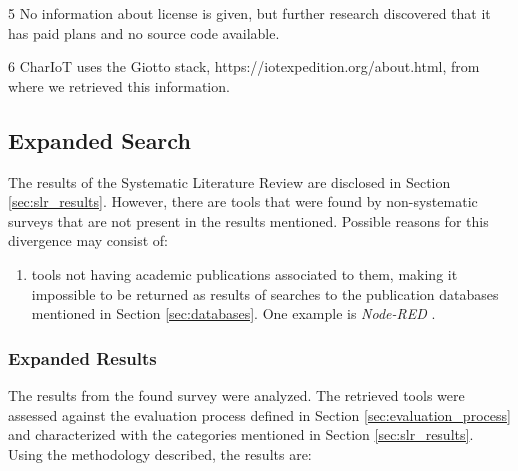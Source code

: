 \begin{table}[ht]
\begin{threeparttable}
\begin{tablenotes}
        \item[5] No information about license is given, but further research discovered that it has paid plans and no source code available.
        \item[6] CharIoT uses the Giotto stack, https://iotexpedition.org/about.html, from where we retrieved this information.
    \end{tablenotes}
    \end{threeparttable}
    \label{tab:slr_table_results}
\end{table}{}

\subsection{Expanded Search}\label{sec:slr_expanded_research}

The results of the Systematic Literature Review are disclosed in Section \ref{sec:slr_results}. However, there are tools that were found by non-systematic surveys \cite{survey_vpl_iot} that are not present in the results mentioned. Possible reasons for this divergence may consist of:
\begin{enumerate}
    \item tools not having academic publications associated to them, making it impossible to be returned as results of searches to the publication databases mentioned in Section \ref{sec:databases}. One example is \textit{Node-RED} \cite{node_red}.
\end{enumerate}

\subsubsection{Expanded Results}

The results from the found survey \cite{survey_vpl_iot} were analyzed. The retrieved tools were assessed against the evaluation process defined in Section \ref{sec:evaluation_process} and characterized with the categories mentioned in Section \ref{sec:slr_results}. Using the methodology described, the results are:


